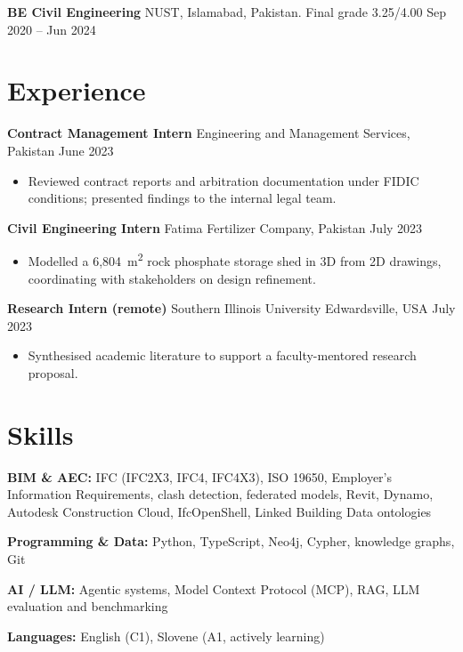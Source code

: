 \documentclass[a4paper,10.5pt]{article}
\newcommand{\datefill}{\dotfill}
\newcommand{\entry}[3]{\vspace{2.5pt}\noindent\textbf{#1} \textbar{} #2 \datefill{} #3\par\vspace{0.5pt}}
\newcommand{\skillrow}[2]{\noindent\textbf{#1:} #2\par\vspace{1pt}}
\begin{document}
\entry{BE Civil Engineering}{NUST, Islamabad, Pakistan. Final grade 3.25/4.00}{Sep 2020 -- Jun 2024}

\section{Experience}
\entry{Contract Management Intern}{Engineering and Management Services, Pakistan}{June 2023}
\begin{itemize}
  \item Reviewed contract reports and arbitration documentation under FIDIC
        conditions; presented findings to the internal legal team.
\end{itemize}

\entry{Civil Engineering Intern}{Fatima Fertilizer Company, Pakistan}{July 2023}
\begin{itemize}
  \item Modelled a 6,804~m\textsuperscript{2} rock phosphate storage shed in 3D from
        2D drawings, coordinating with stakeholders on design refinement.
\end{itemize}

\entry{Research Intern (remote)}{Southern Illinois University Edwardsville, USA}{July 2023}
\begin{itemize}
  \item Synthesised academic literature to support a faculty-mentored research proposal.
\end{itemize}

\section{Skills}

\skillrow{BIM \& AEC}{IFC (IFC2X3, IFC4, IFC4X3), ISO 19650, Employer's Information Requirements, clash detection, federated models, Revit, Dynamo, Autodesk Construction Cloud, IfcOpenShell, Linked Building Data ontologies}
\skillrow{Programming \& Data}{Python, TypeScript, Neo4j, Cypher, knowledge graphs, Git}
\skillrow{AI / LLM}{Agentic systems, Model Context Protocol (MCP), RAG, LLM evaluation and benchmarking}

\skillrow{Languages}{English (C1), Slovene (A1, actively learning)}
\end{document}
